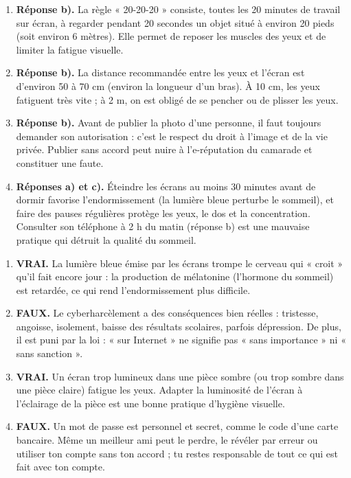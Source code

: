\documentclass[11pt]{article}
\begin{document}
\begin{corrige}
\begin{enumerate}
\item \textbf{Réponse b).} La règle « 20-20-20 » consiste, toutes les 20 minutes de travail sur écran, à regarder pendant 20 secondes un objet situé à environ 20 pieds (soit environ 6 mètres). Elle permet de reposer les muscles des yeux et de limiter la fatigue visuelle.
\item \textbf{Réponse b).} La distance recommandée entre les yeux et l'écran est d'environ 50 à 70 cm (environ la longueur d'un bras). À 10 cm, les yeux fatiguent très vite ; à 2 m, on est obligé de se pencher ou de plisser les yeux.
\item \textbf{Réponse b).} Avant de publier la photo d'une personne, il faut toujours demander son autorisation : c'est le respect du droit à l'image et de la vie privée. Publier sans accord peut nuire à l'e-réputation du camarade et constituer une faute.
\item \textbf{Réponses a) et c).} Éteindre les écrans au moins 30 minutes avant de dormir favorise l'endormissement (la lumière bleue perturbe le sommeil), et faire des pauses régulières protège les yeux, le dos et la concentration. Consulter son téléphone à 2 h du matin (réponse b) est une mauvaise pratique qui détruit la qualité du sommeil.
\end{enumerate}
\end{corrige}

\begin{corrige}
\begin{enumerate}
\item \textbf{VRAI.} La lumière bleue émise par les écrans trompe le cerveau qui « croit » qu'il fait encore jour : la production de mélatonine (l'hormone du sommeil) est retardée, ce qui rend l'endormissement plus difficile.
\item \textbf{FAUX.} Le cyberharcèlement a des conséquences bien réelles : tristesse, angoisse, isolement, baisse des résultats scolaires, parfois dépression. De plus, il est puni par la loi : « sur Internet » ne signifie pas « sans importance » ni « sans sanction ».
\item \textbf{VRAI.} Un écran trop lumineux dans une pièce sombre (ou trop sombre dans une pièce claire) fatigue les yeux. Adapter la luminosité de l'écran à l'éclairage de la pièce est une bonne pratique d'hygiène visuelle.
\item \textbf{FAUX.} Un mot de passe est personnel et secret, comme le code d'une carte bancaire. Même un meilleur ami peut le perdre, le révéler par erreur ou utiliser ton compte sans ton accord ; tu restes responsable de tout ce qui est fait avec ton compte.
\end{enumerate}
\end{corrige}
\end{document}
